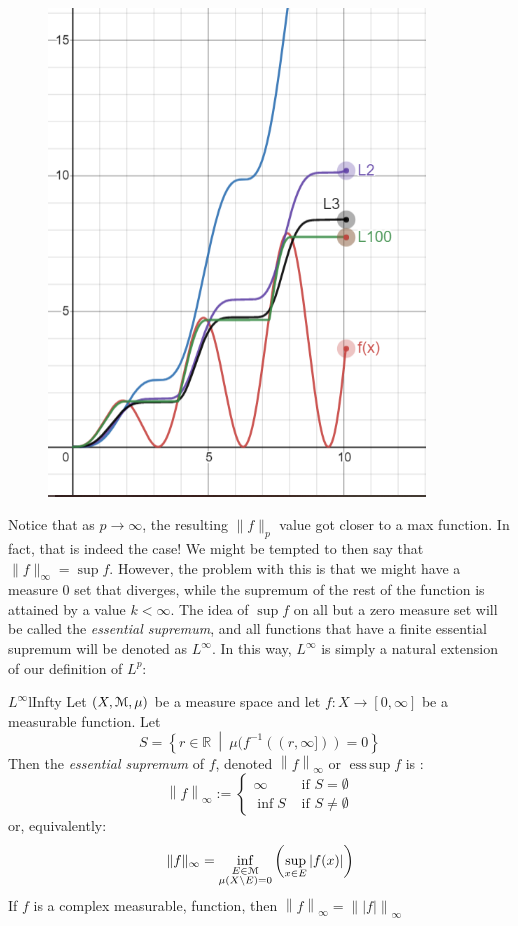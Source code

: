 \documentclass[oneside]{book}
\newcommand{\R}{\mathbb{R}}
\newcommand{\EM}{\EuScript{M}}
\DeclareMathOperator*{\esssup}{ess\,sup}
\newcommand{\set}[2]{\left\{#1 \ \middle|\ #2\right\}}
\newcommand{\rw}{\rightarrow}
\begin{document}
\begin{figure}[H]
	\centering
	\includegraphics[width=10cm]{LInftyNorm}
\end{figure}
Notice that as $p \rw \infty$, the resulting $\|f\|_p$ value got closer to a max function. In fact, that is indeed the
case! We might be tempted to then say that $\|f\|_\infty = \sup f$. However, the problem with this is that we might have
a measure $0$ set that diverges, while the supremum of the rest of the function is attained by a value $k < \infty$.
The idea of $\sup f$ on all but a zero measure set will be called the \emph{essential supremum}, and all functions that
have a finite essential supremum will be denoted as $L^\infty$. In this way, $L^\infty$ is simply a natural extension of our definition of $L^p$:

\begin{defn}{$L^\infty$}{lInfty}
	Let $(X, \EM, \mu)$ be a measure space and let $f: X \rw [0, \infty]$ be a measurable function. Let 
	\[
		S = \set{r \in \R }{\mu(f^{-1}((r, \infty])) = 0}
	\]
	Then the \emph{essential supremum} of $f$, denoted $\left\| f\right\|_{\infty}$ or $\esssup f$ is :
	\[
		\left\| f\right\|_{\infty} := \begin{cases}
			\infty & \text{ if $S = \emptyset$}\\
			\inf S & \text{ if $S \ne \emptyset$}
		\end{cases}
	\]
	or, equivalently:
	\[
		\|f\|_\infty = \inf_{\substack{E \in \EM\\ \mu(X\setminus E) = 0}} \left(\sup_{x \in E} |f(x)|\right)
	\]
	If $f$ is a complex measurable, function, then $\left\| f\right\|_\infty = \left\| |f|\right\|_\infty$
\end{defn}
\end{document}
